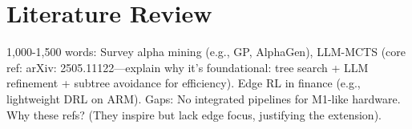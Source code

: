 \section{Literature Review}
\label{sec:litera}

1,000-1,500 words: Survey alpha mining (e.g., GP, AlphaGen), LLM-MCTS (core ref: arXiv:
2505.11122—explain why it's foundational: tree search + LLM refinement + subtree avoidance for efficiency). Edge RL in finance (e.g., lightweight DRL on ARM). Gaps: No integrated pipelines for M1-like hardware. Why these refs? (They inspire but lack edge focus, justifying the extension).
